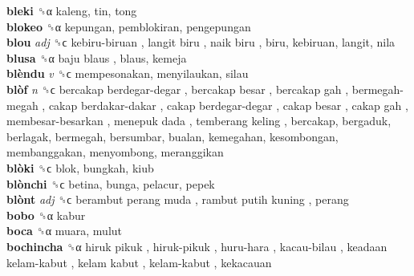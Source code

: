 \textbf{bleki} ␝α  kaleng, tin, tong  \\
\textbf{blokeo} ␝α  kepungan, pemblokiran, pengepungan  \\
\textbf{blou} \emph{adj}  ␝ϲ   kebiru-biruan ,  langit biru ,  naik biru , biru, kebiruan, langit, nila  \\
\textbf{blusa} ␝α   baju blaus , blaus, kemeja  \\
\textbf{blèndu} \emph{v}  ␝ϲ  mempesonakan, menyilaukan, silau  \\
\textbf{blòf} \emph{n}  ␝ϲ   bercakap berdegar-degar ,  bercakap besar ,  bercakap gah ,  bermegah-megah ,  cakap berdakar-dakar ,  cakap berdegar-degar ,  cakap besar ,  cakap gah ,  membesar-besarkan ,  menepuk dada ,  temberang keling , bercakap, bergaduk, berlagak, bermegah, bersumbar, bualan, kemegahan, kesombongan, membanggakan, menyombong, meranggikan  \\
\textbf{blòki} ␝ϲ  blok, bungkah, kiub  \\
\textbf{blònchi} ␝ϲ  betina, bunga, pelacur, pepek  \\
\textbf{blònt} \emph{adj}  ␝ϲ   berambut perang muda ,  rambut putih kuning , perang  \\
\textbf{bobo} ␝α  kabur  \\
\textbf{boca} ␝α  muara, mulut  \\
\textbf{bochincha} ␝α   hiruk pikuk ,  hiruk-pikuk ,  huru-hara ,  kacau-bilau ,  keadaan kelam-kabut ,  kelam kabut ,  kelam-kabut , kekacauan  \\

